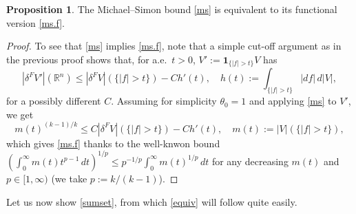 \documentclass[11pt,a4paper]{amsart}
\newcommand{\R}{\mathbb{R}}
\newcommand{\uno}{\bm{1}}
\theoremstyle{definition}
\newtheorem{proposition}[definition]{Proposition}
\begin{document}
\begin{proposition}\label{functional}
    The Michael--Simon bound \cref{ms} is equivalent to its functional version
    \cref{ms.f}.
\end{proposition}

\begin{proof}
    To see that \cref{ms} implies \cref{ms.f}, note that a simple cut-off argument as in the previous proof shows that, for a.e.\ $t>0$,
$V':=\uno_{\{|f|>t\}}V$ has
$$|\delta^FV'|(\R^n)\le |\delta^FV|(\{|f|>t\})-Ch'(t),\quad h(t):=\int_{\{|f|>t\}}|df|\,d|V|,$$
for a possibly different $C$. Assuming for simplicity $\theta_0=1$ and applying \cref{ms} to $V'$, we get
$$m(t)^{(k-1)/k}\le C|\delta^FV|(\{|f|>t\})-Ch'(t),\quad m(t):=|V|(\{|f|>t\}),$$
which gives \cref{ms.f} thanks to the well-knwon bound $(\int_0^\infty m(t)t^{p-1}\,dt)^{1/p}
\le p^{-1/p}\int_0^\infty m(t)^{1/p}\,dt$ for any decreasing $m(t)$
and $p\in[1,\infty)$ (we take $p:=k/(k-1)$).
\end{proof}

Let us now show \cref{sumset}, from which \cref{equiv} will follow quite easily.
\end{document}
